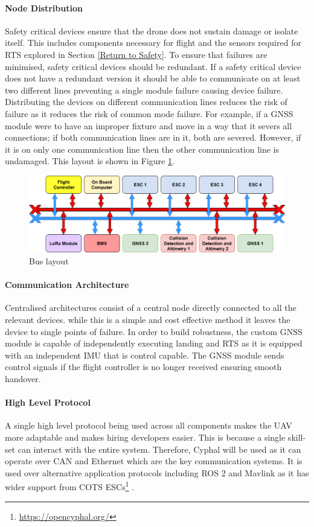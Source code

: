 \paragraph{Node Distribution}
Safety critical devices ensure that the drone does not sustain damage or isolate itself. This includes components necessary for flight and the sensors required for \gls{RTS} explored in Section \ref{Return to Safety}. To ensure that failures are minimised, safety critical devices should be redundant. If a safety critical device does not have a redundant version it should be able to communicate on at least two different lines preventing a single module failure causing device failure. Distributing the devices on different communication lines reduces the risk of failure as it reduces the risk of common mode failure. For example, if a \gls{GNSS} module were to have an improper fixture and move in a way that it severs all connections; if both communication lines are in it, both are severed. However, if it is on only one communication line then the other communication line is undamaged. This layout is shown in Figure \ref{fig:CAN_bus}. 
 \begin{figure}[h]
 \centering
  \includegraphics[width=1\textwidth]{figs/Thomas/Intra Communication/CAN bus.png}
 \caption{Bus layout}
 \label{fig:CAN_bus}
 \end{figure}
\paragraph{Communication Architecture}
Centralised architectures consist of a central node directly connected to all the relevant devices. while this is a simple and cost effective method it leaves the device to single points of failure. In order to build robustness, the custom \gls{GNSS} module is capable of independently executing landing and \gls{RTS} as it is equipped with an independent \gls{IMU} that is control capable. The \gls{GNSS} module sends control signals if the flight controller is no longer received ensuring smooth handover. 
\paragraph{High Level Protocol}
A single high level protocol being used across all components makes the \gls{UAV} more adaptable and makes hiring developers easier. This is because a single skill-set can interact with the entire system. Therefore, Cyphal will be used as it can operate over \gls{CAN} and Ethernet which are the key communication systems. It is used over alternative application protocols including ROS 2 and Mavlink as it has wider support from \gls{COTS} \gls{ESC}s\footnote{\url{https://opencyphal.org/}} . 